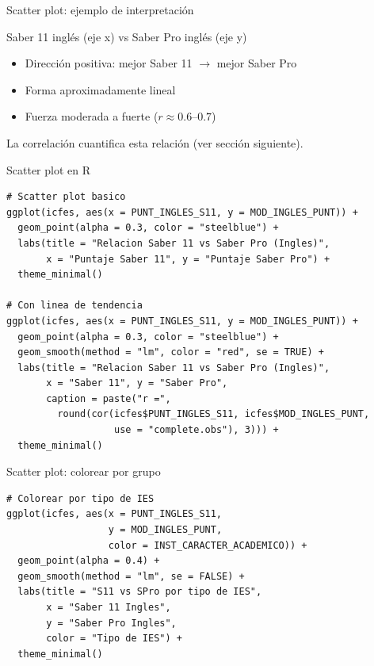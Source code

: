 \documentclass[aspectratio=169, 11pt]{beamer}
\begin{document}
\begin{frame}{Scatter plot: ejemplo de interpretación}
\begin{exampleblock}{Saber 11 inglés (eje x) vs Saber Pro inglés (eje y)}
\begin{itemize}
\item Dirección positiva: mejor Saber 11 $\to$ mejor Saber Pro
\item Forma aproximadamente lineal
\item Fuerza moderada a fuerte ($r \approx 0.6$--$0.7$)
\end{itemize}
\end{exampleblock}

\vspace{0.5em}
La correlación cuantifica esta relación (ver sección siguiente).
\end{frame}

\begin{frame}[fragile]{Scatter plot en R}
\begin{lstlisting}[basicstyle=\ttfamily\scriptsize]
# Scatter plot basico
ggplot(icfes, aes(x = PUNT_INGLES_S11, y = MOD_INGLES_PUNT)) +
  geom_point(alpha = 0.3, color = "steelblue") +
  labs(title = "Relacion Saber 11 vs Saber Pro (Ingles)",
       x = "Puntaje Saber 11", y = "Puntaje Saber Pro") +
  theme_minimal()

# Con linea de tendencia
ggplot(icfes, aes(x = PUNT_INGLES_S11, y = MOD_INGLES_PUNT)) +
  geom_point(alpha = 0.3, color = "steelblue") +
  geom_smooth(method = "lm", color = "red", se = TRUE) +
  labs(title = "Relacion Saber 11 vs Saber Pro (Ingles)",
       x = "Saber 11", y = "Saber Pro",
       caption = paste("r =",
         round(cor(icfes$PUNT_INGLES_S11, icfes$MOD_INGLES_PUNT,
                   use = "complete.obs"), 3))) +
  theme_minimal()
\end{lstlisting}
\end{frame}

\begin{frame}[fragile]{Scatter plot: colorear por grupo}
\begin{lstlisting}
# Colorear por tipo de IES
ggplot(icfes, aes(x = PUNT_INGLES_S11,
                  y = MOD_INGLES_PUNT,
                  color = INST_CARACTER_ACADEMICO)) +
  geom_point(alpha = 0.4) +
  geom_smooth(method = "lm", se = FALSE) +
  labs(title = "S11 vs SPro por tipo de IES",
       x = "Saber 11 Ingles",
       y = "Saber Pro Ingles",
       color = "Tipo de IES") +
  theme_minimal()
\end{lstlisting}
\end{frame}
\end{document}
